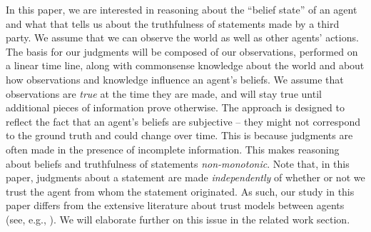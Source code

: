 \documentclass{article}
\begin{document}
In this paper, we are interested in reasoning about the ``belief state'' of an agent and what that tells us about the truthfulness of statements made by a third party. We assume that we can observe the world as well as other agents' actions. The basis for our judgments will be composed of our observations, performed on
a linear time line, along with  commonsense knowledge about the world and about how observations and knowledge influence an agent's beliefs. We assume that observations are \emph{true} at the time they are made, and will stay true until additional pieces of information prove otherwise. The approach is designed to reflect the fact that an agent's beliefs are subjective -- they might not correspond to the ground truth and could change over time. This is because judgments are often made in the presence of incomplete information. This makes reasoning about beliefs and truthfulness of statements \emph{non-monotonic}. Note that, in this paper, judgments about a statement are made  \emph{independently} of whether or not we trust the agent from whom the statement originated. As such, our study in this paper differs from the 
extensive literature about trust models between agents  (see, e.g., \cite{ArtzG07,SabaterS05}). We will elaborate further on this issue in the related work section. 
\end{document}
